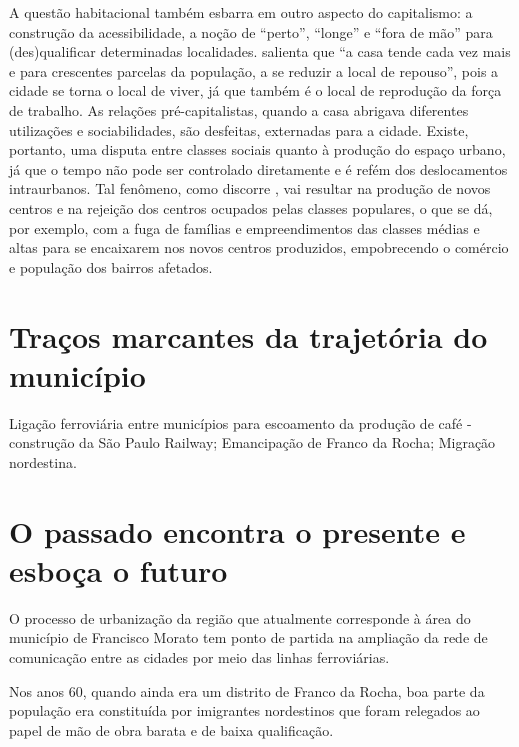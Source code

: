 	A questão habitacional também esbarra em outro aspecto do capitalismo: a construção da acessibilidade, a noção de ``perto'', ``longe'' e ``fora de mão'' para (des)qualificar determinadas localidades.  salienta que ``a casa tende cada vez mais e para crescentes parcelas da população, a se reduzir a local de repouso'', pois a cidade se torna o local de viver, já que também é o local de reprodução da força de trabalho. As relações pré-capitalistas, quando a casa abrigava diferentes utilizações e sociabilidades, são desfeitas, externadas para a cidade. Existe, portanto, uma disputa entre classes sociais quanto à produção do espaço urbano, já que o tempo não pode ser controlado diretamente e é refém dos deslocamentos intraurbanos. Tal fenômeno, como discorre , vai resultar na produção de novos centros e na rejeição dos centros ocupados pelas classes populares, o que se dá, por exemplo, com a fuga de famílias e empreendimentos das classes médias e altas para se encaixarem nos novos centros produzidos, empobrecendo o comércio e população dos bairros afetados.
	
	\section{Traços marcantes da trajetória do município}
		
	Ligação ferroviária entre municípios para escoamento da produção de café - construção da São Paulo Railway; Emancipação de Franco da Rocha; Migração nordestina.
	
	\section{O passado encontra o presente e esboça o futuro}
	
	O processo de urbanização da região que atualmente corresponde à área do município de Francisco Morato tem ponto de partida na ampliação da rede de comunicação entre as cidades por meio das linhas ferroviárias.
	
	Nos anos 60, quando ainda era um distrito de Franco da Rocha, boa parte da população era constituída por imigrantes nordestinos que foram relegados ao papel de mão de obra barata e de baixa qualificação.
	
